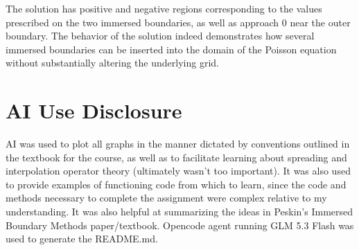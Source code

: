 \documentclass[11pt,letterpaper]{article}
\begin{document}
The solution has positive and negative regions corresponding to the values prescribed on the two immersed boundaries, as well as approach 0 near the outer boundary. The behavior of the solution indeed demonstrates how several immersed boundaries can be inserted into the domain of the Poisson equation without substantially altering the underlying grid.

\section{AI Use Disclosure}
AI was used to plot all graphs in the manner dictated by conventions outlined in the textbook for the course, as well as to facilitate learning about spreading and interpolation operator theory (ultimately wasn't too important). It was also used to provide examples of functioning code from which to learn, since the code and methods necessary to complete the assignment were complex relative to my understanding. It was also helpful at summarizing the ideas in Peskin's Immersed Boundary Methods paper/textbook. Opencode agent running GLM 5.3 Flash was used to generate the README.md.
\end{document}
